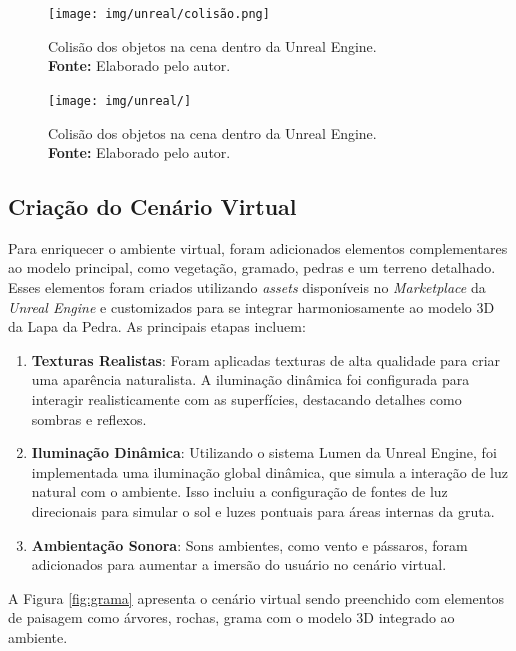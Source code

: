 \begin{figure}[H]
        \centering
        \texttt{[image: img/unreal/colisão.png]}
        \caption{Colisão dos objetos na cena dentro da Unreal Engine. \\
            \textbf{Fonte:} Elaborado pelo autor.}
        \label{fig:colisao}
\end{figure}

\begin{figure}[H]
        \centering
        \texttt{[image: img/unreal/]}
        \caption{Colisão dos objetos na cena dentro da Unreal Engine. \\
            \textbf{Fonte:} Elaborado pelo autor.}
        \label{fig:colisao}
\end{figure}

\subsection{Criação do Cenário Virtual}
Para enriquecer o ambiente virtual, foram adicionados elementos complementares ao modelo principal, como vegetação, gramado, pedras e um terreno detalhado. Esses elementos foram criados utilizando \textit{assets} disponíveis no \textit{Marketplace} da \textit{Unreal Engine} e customizados para se integrar harmoniosamente ao modelo 3D da Lapa da Pedra. As principais etapas incluem:
\begin{enumerate}
    \item \textbf{Texturas Realistas}: Foram aplicadas texturas de alta qualidade para criar uma aparência naturalista. A iluminação dinâmica foi configurada para interagir realisticamente com as superfícies, destacando detalhes como sombras e reflexos.
    \item \textbf{Iluminação Dinâmica}: Utilizando o sistema Lumen da Unreal Engine, foi implementada uma iluminação global dinâmica, que simula a interação de luz natural com o ambiente. Isso incluiu a configuração de fontes de luz direcionais para simular o sol e luzes pontuais para áreas internas da gruta.
    \item \textbf{Ambientação Sonora}: Sons ambientes, como vento e pássaros, foram adicionados para aumentar a imersão do usuário no cenário virtual.
\end{enumerate}
A Figura \ref{fig:grama} apresenta o cenário virtual sendo preenchido com elementos de paisagem como árvores, rochas, grama com o modelo 3D integrado ao ambiente.
